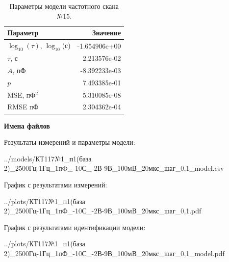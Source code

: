 \begin{table}[!ht]
    \centering
    \caption{Параметры модели частотного скана №15.}
    \begin{tabular}{|l|r|}
        \hline
        Параметр                                       & Значение                  \\ \hline
        $\log_{10}(\tau)$, $\log_{10}$(с)              & -1.654906e+00             \\ \hline
        $\tau$, с                                      & 2.213576e-02              \\ \hline
        $A$, пФ                                        & -8.392233e-03             \\ \hline
        $p$                                            & 7.493385e-01              \\ \hline
        MSE, пФ$^2$                                    & 5.310085e-08              \\ \hline
        RMSE пФ                                        & 2.304362e-04              \\ \hline
    \end{tabular}
    \label{table:frequency_scan_model_15}
\end{table}

\textbf{Имена файлов}

Результаты измерений и параметры модели:

\scriptsize../models/КТ117№1\_п1(база 2)\_2500Гц-1Гц\_1пФ\_-10С\_-2В-9В\_100мВ\_20мкс\_шаг\_0,1\_model.csv
\normalsize

График с результатами измерений:

\scriptsize../plots/КТ117№1\_п1(база 2)\_2500Гц-1Гц\_1пФ\_-10С\_-2В-9В\_100мВ\_20мкс\_шаг\_0,1.pdf
\normalsize

График с результатами идентификации модели:

\scriptsize../plots/КТ117№1\_п1(база 2)\_2500Гц-1Гц\_1пФ\_-10С\_-2В-9В\_100мВ\_20мкс\_шаг\_0,1\_model.pdf
\normalsize

